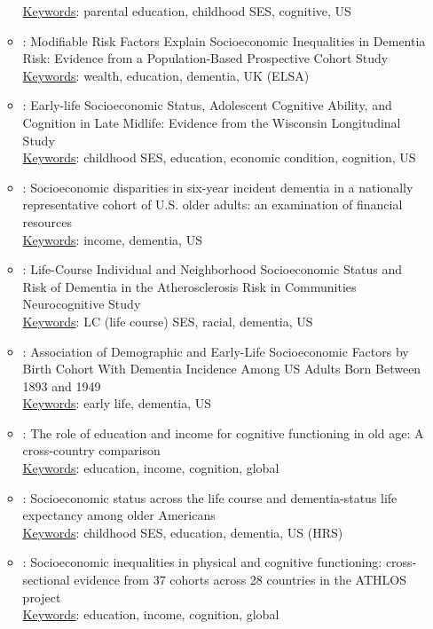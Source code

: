 \documentclass[12pt]{article}
\begin{document}
\begin{itemize}
\begin{itemize}
        \uline{Keywords}: parental education, childhood SES, cognitive, US 
        \item \cite{deckers2019modifiable}: Modifiable Risk Factors Explain Socioeconomic Inequalities in Dementia Risk: Evidence from a Population-Based Prospective Cohort Study \\
        \uline{Keywords}: wealth, education, dementia, UK (ELSA)
        \item \cite{zhang2020early}: Early-life Socioeconomic Status, Adolescent Cognitive Ability, and Cognition in Late Midlife: Evidence from the Wisconsin Longitudinal Study \\
        \uline{Keywords}: childhood SES, education, economic condition, cognition, US
        \item \cite{samuel2020socioeconomic}: Socioeconomic disparities in six-year incident dementia in a nationally representative cohort of U.S. older adults: an examination of financial resources \\
        \uline{Keywords}: income, dementia, US
        \item \cite{george2020life}: Life-Course Individual and Neighborhood Socioeconomic Status and Risk of Dementia in the Atherosclerosis Risk in Communities Neurocognitive Study \\
        \uline{Keywords}: LC (life course) SES, racial, dementia, US
        \item \cite{tom2020association}: Association of Demographic and Early-Life Socioeconomic Factors by Birth Cohort With Dementia Incidence Among US Adults Born Between 1893 and 1949 \\
        \uline{Keywords}: early life, dementia, US
        \item \cite{rodriguez2021role}: The role of education and income for cognitive functioning in old age: A cross‐country comparison \\
        \uline{Keywords}: education, income, cognition, global
        \item \cite{cha2021socioeconomic}: Socioeconomic status across the life course and dementia-status life expectancy among older Americans \\
        \uline{Keywords}: childhood SES, education, dementia, US (HRS)
        \item \cite{stefler2021socioeconomic}: Socioeconomic inequalities in physical and cognitive functioning: cross-sectional evidence from 37 cohorts across 28 countries in the ATHLOS project \\
        \uline{Keywords}: education, income, cognition, global

\end{itemize}
\end{itemize}
\end{document}
